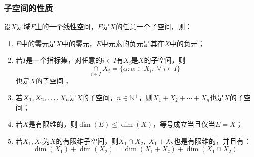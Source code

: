 \subsubsection{子空间的性质}
\begin{property}\label{prop:Subspace}
	设$X$是域$F$上的一个线性空间，$E$是$X$的任意一个子空间，则：
	\begin{enumerate}
		\item $E$中的零元是$X$中的零元，$E$中元素的负元是其在$X$中的负元；
		\item 若$I$是一个指标集，对任意的$i\in I$有$X_i$是$X$的子空间，则
		\begin{equation*}
			\underset{i\in I}{\overset{}{\cap}}X_i=\{\alpha:\alpha\in X_i,\;\forall\;i\in I\}
		\end{equation*}
		也是$X$的子空间；
		\item 若$X_1, X_2, \dots, X_{n}$是$X$的子空间，$n\in\mathbb{N}^+$，则$X_1+X_2+\cdots+X_n$也是$X$的子空间；
		\item 若$X$是有限维的，则$\dim(E)\leqslant\dim(X)$，等号成立当且仅当$E=X$；
		\item 若$X_1,X_2$为$X$的有限维子空间，则$X_1\cap X_2,\;X_1+X_2$也是有限维的，并且有：
		\begin{equation*}
			\dim(X_1)+\dim(X_2)=\dim(X_1+X_2)+\dim(X_1\cap X_2)
		\end{equation*}
	\end{enumerate}
\end{property}
